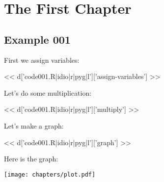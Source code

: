 \chapter{The First Chapter}

\section{Example 001}
First we assign variables:

<< d['code001.R|idio|r|pyg|l']['assign-variables'] >>

Let's do some multiplication:

<< d['code001.R|idio|r|pyg|l']['multiply'] >>

Let's make a graph:

<< d['code001.R|idio|r|pyg|l']['graph'] >>

Here is the graph:

\texttt{[image: chapters/plot.pdf]}


